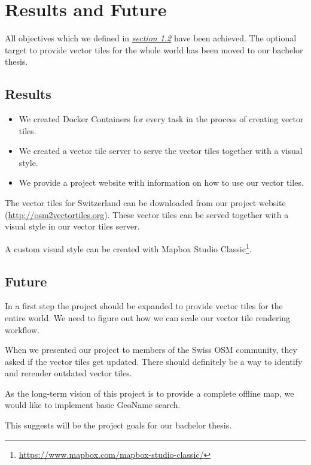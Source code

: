 \chapter{Results and Future}\label{part1_results_and_future}

All objectives which we defined in \hyperref[targets]{\emph{section 1.2}} have been achieved. The optional target to provide vector tiles for the whole world has been moved to our bachelor thesis.

\section{Results}\label{part1_results}

\begin{itemize}
\item
  We created Docker Containers for every task in the process of creating vector tiles.
\item
  We created a vector tile server to serve the vector tiles together with a visual style.
\item
  We provide a project website with information on how to use our vector tiles.
\end{itemize}

The vector tiles for Switzerland can be downloaded from our project website (\url{http://osm2vectortiles.org}). These vector tiles can be served together with a visual style in our vector tiles server.

A custom visual style can be created with Mapbox Studio Classic\footnote{\url{https://www.mapbox.com/mapbox-studio-classic/}}.

\section{Future}\label{part1_future}
In a first step the project should be expanded to provide vector tiles for the entire world. We need to figure out how we can scale our vector tile rendering workflow.

When we presented our project to members of the Swiss OSM community, they asked if the vector tiles get updated. There should definitely be a way to identify and rerender outdated vector tiles.

As the long-term vision of this project is to provide a complete offline map, we would like to implement basic GeoName search.

This suggests will be the project goals for our bachelor thesis.

\newpage